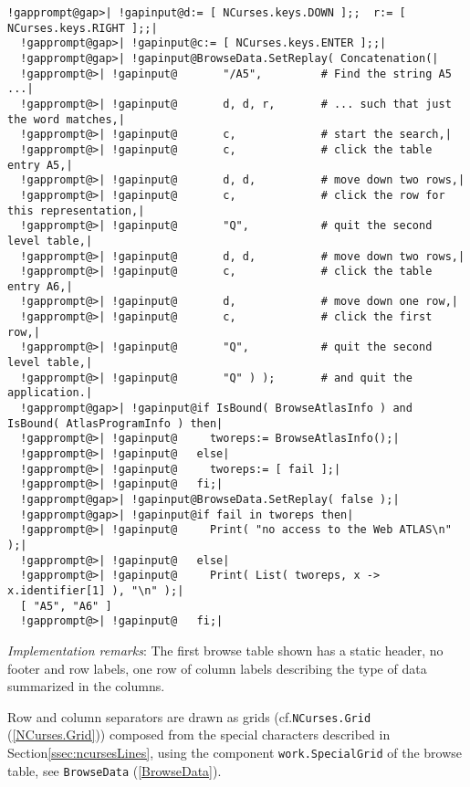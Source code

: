 \documentclass[a4paper,11pt]{report}
\begin{document}
{{{ 
\begin{Verbatim}[commandchars=!@|,fontsize=\small,frame=single,label=Example]
  !gapprompt@gap>| !gapinput@d:= [ NCurses.keys.DOWN ];;  r:= [ NCurses.keys.RIGHT ];;|
  !gapprompt@gap>| !gapinput@c:= [ NCurses.keys.ENTER ];;|
  !gapprompt@gap>| !gapinput@BrowseData.SetReplay( Concatenation(|
  !gapprompt@>| !gapinput@       "/A5",         # Find the string A5 ...|
  !gapprompt@>| !gapinput@       d, d, r,       # ... such that just the word matches,|
  !gapprompt@>| !gapinput@       c,             # start the search,|
  !gapprompt@>| !gapinput@       c,             # click the table entry A5,|
  !gapprompt@>| !gapinput@       d, d,          # move down two rows,|
  !gapprompt@>| !gapinput@       c,             # click the row for this representation,|
  !gapprompt@>| !gapinput@       "Q",           # quit the second level table,|
  !gapprompt@>| !gapinput@       d, d,          # move down two rows,|
  !gapprompt@>| !gapinput@       c,             # click the table entry A6,|
  !gapprompt@>| !gapinput@       d,             # move down one row,|
  !gapprompt@>| !gapinput@       c,             # click the first row,|
  !gapprompt@>| !gapinput@       "Q",           # quit the second level table,|
  !gapprompt@>| !gapinput@       "Q" ) );       # and quit the application.|
  !gapprompt@gap>| !gapinput@if IsBound( BrowseAtlasInfo ) and IsBound( AtlasProgramInfo ) then|
  !gapprompt@>| !gapinput@     tworeps:= BrowseAtlasInfo();|
  !gapprompt@>| !gapinput@   else|
  !gapprompt@>| !gapinput@     tworeps:= [ fail ];|
  !gapprompt@>| !gapinput@   fi;|
  !gapprompt@gap>| !gapinput@BrowseData.SetReplay( false );|
  !gapprompt@gap>| !gapinput@if fail in tworeps then|
  !gapprompt@>| !gapinput@     Print( "no access to the Web ATLAS\n" );|
  !gapprompt@>| !gapinput@   else|
  !gapprompt@>| !gapinput@     Print( List( tworeps, x -> x.identifier[1] ), "\n" );|
  [ "A5", "A6" ]
  !gapprompt@>| !gapinput@   fi;|
\end{Verbatim}
 

 \emph{Implementation remarks}: The first browse table shown has a static header, no footer and row labels,
one row of column labels describing the type of data summarized in the
columns. 

 Row and column separators are drawn as grids (cf.{\nobreakspace}\texttt{NCurses.Grid} (\ref{NCurses.Grid})) composed from the special characters described in Section{\nobreakspace}\ref{ssec:ncursesLines}, using the component \texttt{work.SpecialGrid} of the browse table, see \texttt{BrowseData} (\ref{BrowseData}). 

}}}
\end{document}
